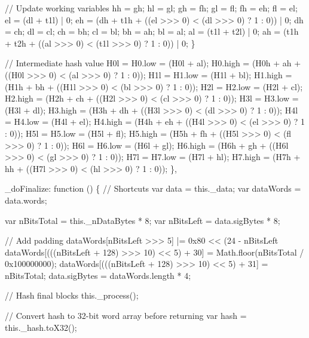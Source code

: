 \begin{DoxyCodeInclude}
                \textcolor{comment}{// Update working variables}
                hh = gh;
                hl = gl;
                gh = fh;
                gl = fl;
                fh = eh;
                fl = el;
                el = (dl + t1l) | 0;
                eh = (dh + t1h + ((el >>> 0) < (dl >>> 0) ? 1 : 0)) | 0;
                dh = ch;
                dl = cl;
                ch = bh;
                cl = bl;
                bh = ah;
                bl = al;
                al = (t1l + t2l) | 0;
                ah = (t1h + t2h + ((al >>> 0) < (t1l >>> 0) ? 1 : 0)) | 0;
            \}

            \textcolor{comment}{// Intermediate hash value}
            H0l = H0.low  = (H0l + al);
            H0.high = (H0h + ah + ((H0l >>> 0) < (al >>> 0) ? 1 : 0));
            H1l = H1.low  = (H1l + bl);
            H1.high = (H1h + bh + ((H1l >>> 0) < (bl >>> 0) ? 1 : 0));
            H2l = H2.low  = (H2l + cl);
            H2.high = (H2h + ch + ((H2l >>> 0) < (cl >>> 0) ? 1 : 0));
            H3l = H3.low  = (H3l + dl);
            H3.high = (H3h + dh + ((H3l >>> 0) < (dl >>> 0) ? 1 : 0));
            H4l = H4.low  = (H4l + el);
            H4.high = (H4h + eh + ((H4l >>> 0) < (el >>> 0) ? 1 : 0));
            H5l = H5.low  = (H5l + fl);
            H5.high = (H5h + fh + ((H5l >>> 0) < (fl >>> 0) ? 1 : 0));
            H6l = H6.low  = (H6l + gl);
            H6.high = (H6h + gh + ((H6l >>> 0) < (gl >>> 0) ? 1 : 0));
            H7l = H7.low  = (H7l + hl);
            H7.high = (H7h + hh + ((H7l >>> 0) < (hl >>> 0) ? 1 : 0));
        \},

        \_doFinalize: \textcolor{keyword}{function} () \{
            \textcolor{comment}{// Shortcuts}
            var data = this.\_data;
            var dataWords = data.words;

            var nBitsTotal = this.\_nDataBytes * 8;
            var nBitsLeft = data.sigBytes * 8;

            \textcolor{comment}{// Add padding}
            dataWords[nBitsLeft >>> 5] |= 0x80 << (24 - nBitsLeft %
            dataWords[(((nBitsLeft + 128) >>> 10) << 5) + 30] = Math.floor(nBitsTotal / 0x100000000);
            dataWords[(((nBitsLeft + 128) >>> 10) << 5) + 31] = nBitsTotal;
            data.sigBytes = dataWords.length * 4;

            \textcolor{comment}{// Hash final blocks}
            this.\_process();

            \textcolor{comment}{// Convert hash to 32-bit word array before returning}
            var hash = this.\_hash.toX32();


\end{DoxyCodeInclude}
